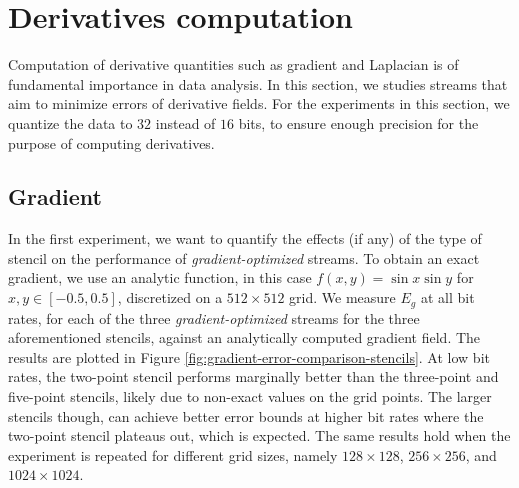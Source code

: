\section{Derivatives computation}

Computation of derivative quantities such as gradient and Laplacian is of fundamental importance in
data analysis. In this section, we studies streams that aim to minimize errors of derivative fields.
For the experiments in this section, we quantize the data to $32$ instead of $16$ bits, to ensure
enough precision for the purpose of computing derivatives.

\subsection{Gradient}


In the first experiment, we want to quantify the effects (if any) of the type of stencil on the
performance of \emph{gradient-optimized} streams. To obtain an exact gradient, we use an analytic
function, in this case $f(x,y)=\sin x\sin y$ for $x,y\in[-0.5,0.5]$, discretized on a $512\times
512$ grid. We measure $E_g$ at all bit rates, for each of the three \emph{gradient-optimized}
streams for the three aforementioned stencils, against an analytically computed gradient field. The
results are plotted in Figure \ref{fig:gradient-error-comparison-stencils}. At low bit rates, the
two-point stencil performs marginally better than the three-point and five-point stencils, likely
due to non-exact values on the grid points. The larger stencils though, can achieve better error
bounds at higher bit rates where the two-point stencil plateaus out, which is expected. The same
results hold when the experiment is repeated for different grid sizes, namely $128\times 128$,
$256\times 256$, and $1024 \times 1024$.


